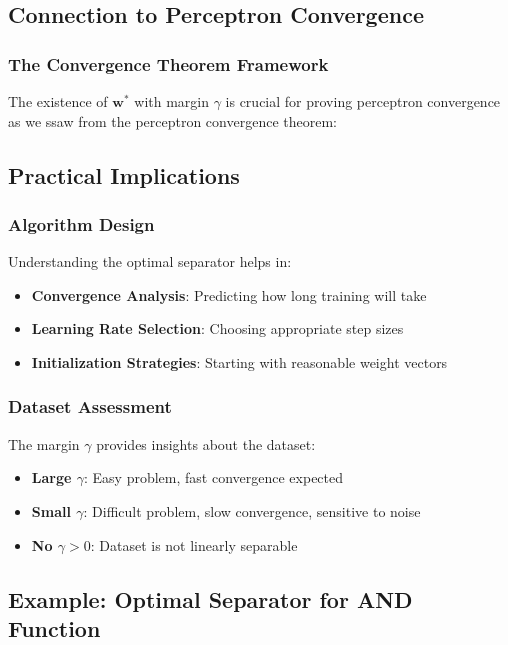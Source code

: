 \subsection{Connection to Perceptron Convergence}

\subsubsection{The Convergence Theorem Framework}
The existence of \(\mathbf{w}^*\) with margin \(\gamma\) is crucial for proving perceptron convergence as we ssaw from the perceptron convergence theorem:
\subsection{Practical Implications}

\subsubsection{Algorithm Design}
Understanding the optimal separator helps in:
\begin{itemize}
    \item \textbf{Convergence Analysis}: Predicting how long training will take
    \item \textbf{Learning Rate Selection}: Choosing appropriate step sizes
    \item \textbf{Initialization Strategies}: Starting with reasonable weight vectors
\end{itemize}

\subsubsection{Dataset Assessment}
The margin \(\gamma\) provides insights about the dataset:
\begin{itemize}
    \item \textbf{Large \(\gamma\)}: Easy problem, fast convergence expected
    \item \textbf{Small \(\gamma\)}: Difficult problem, slow convergence, sensitive to noise
    \item \textbf{No \(\gamma > 0\)}: Dataset is not linearly separable
\end{itemize}

\subsection{Example: Optimal Separator for AND Function}

